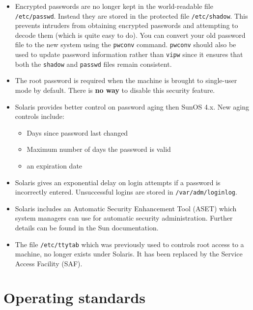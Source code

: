 \begin{itemize}

\item Encrypted passwords are no longer kept in the world-readable 
file {\tt /etc/passwd}. Instead they are stored in the protected
file {\tt /etc/shadow}. This prevents intruders from obtaining 
encrypted passwords and attempting to decode them (which is quite 
easy to do). You can convert your old password file to the new system
using the {\tt pwconv} command. {\tt pwconv} should also
be used to update password information rather than {\tt vipw} since it 
ensures that both the {\tt shadow} and {\tt passwd} files remain consistent.  

\item The root password is required when the machine is brought to single-user
mode by default. There is {\bf no way} to disable this security feature.

\item Solaris provides better control on password aging then SunOS 4.x.
New aging controls include:

\begin{itemize}

\item Days since password last changed

\item Maximum number of days the password is valid

\item an expiration date

\end{itemize}

\item Solaris gives an exponential delay on login attempts if a password is
incorrectly entered. Unsuccessful logins are stored in {\tt /var/adm/loginlog}.

\item Solaris includes an Automatic Security Enhancement Tool (ASET)
which system managers can use for automatic security administration. 
Further details can be found in the Sun documentation. 

\item The file {\tt /etc/ttytab} which was previously used to controls
root access to a machine, no longer exists under Solaris. It has been replaced
by the Service Access Facility (SAF). 

\end{itemize}


\section{Operating standards}

